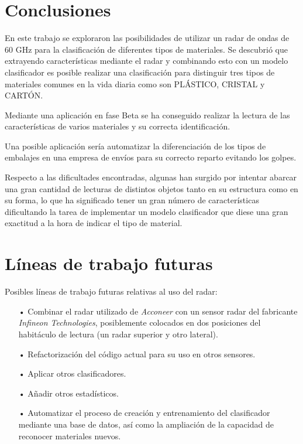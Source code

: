 
\section{Conclusiones}

En este trabajo se exploraron las posibilidades de utilizar un radar de ondas de 60 GHz para la clasificación de diferentes tipos de materiales. Se descubrió que extrayendo características mediante el radar y combinando esto con un modelo clasificador es posible realizar una clasificación para distinguir tres tipos de materiales comunes en la vida diaria como son PLÁSTICO, CRISTAL y CARTÓN. 

Mediante una aplicación en fase Beta se ha conseguido realizar la lectura de las características de varios materiales y su correcta identificación.

Una posible aplicación sería automatizar la diferenciación de los tipos de embalajes en una empresa de envíos para su correcto reparto evitando los golpes.

Respecto a las dificultades encontradas, algunas han surgido por intentar abarcar una gran cantidad de lecturas de distintos objetos tanto en su estructura como en su forma, lo que ha significado tener un gran número de características dificultando la tarea de implementar un modelo clasificador que diese una gran exactitud a la hora de indicar el tipo de material.

\section{Líneas de trabajo futuras}

Posibles líneas de trabajo futuras relativas al uso del radar:

\begin{itemize}
\item[•] Combinar el radar utilizado de \textit{Acconeer} con un sensor radar del fabricante \textit{Infineon Technologies}, posiblemente colocados en dos posiciones del habitáculo de lectura (un radar superior y otro lateral).
\item[•] Refactorización del código actual para su uso en otros sensores.
\item[•] Aplicar otros clasificadores.
\item[•] Añadir otros estadísticos.
\item[•] Automatizar el proceso de creación y entrenamiento del clasificador mediante una base de datos, así como la ampliación de la capacidad de reconocer materiales nuevos.
\end{itemize}

